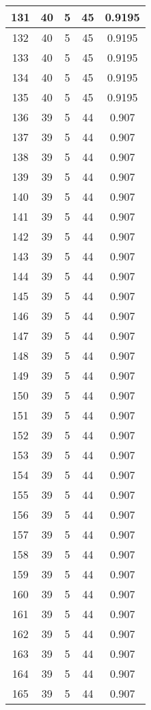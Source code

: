 \documentclass[letterpaper, 12pt]{article}
\begin{document}
\begin{longtable}{|c|c|c|c|c|}
\hline
131 & 40 & 5 & 45 & 0.9195 \\
\hline
132 & 40 & 5 & 45 & 0.9195 \\
\hline
133 & 40 & 5 & 45 & 0.9195 \\
\hline
134 & 40 & 5 & 45 & 0.9195 \\
\hline
135 & 40 & 5 & 45 & 0.9195 \\
\hline
136 & 39 & 5 & 44 & 0.907 \\
\hline
137 & 39 & 5 & 44 & 0.907 \\
\hline
138 & 39 & 5 & 44 & 0.907 \\
\hline
139 & 39 & 5 & 44 & 0.907 \\
\hline
140 & 39 & 5 & 44 & 0.907 \\
\hline
141 & 39 & 5 & 44 & 0.907 \\
\hline
142 & 39 & 5 & 44 & 0.907 \\
\hline
143 & 39 & 5 & 44 & 0.907 \\
\hline
144 & 39 & 5 & 44 & 0.907 \\
\hline
145 & 39 & 5 & 44 & 0.907 \\
\hline
146 & 39 & 5 & 44 & 0.907 \\
\hline
147 & 39 & 5 & 44 & 0.907 \\
\hline
148 & 39 & 5 & 44 & 0.907 \\
\hline
149 & 39 & 5 & 44 & 0.907 \\
\hline
150 & 39 & 5 & 44 & 0.907 \\
\hline
151 & 39 & 5 & 44 & 0.907 \\
\hline
152 & 39 & 5 & 44 & 0.907 \\
\hline
153 & 39 & 5 & 44 & 0.907 \\
\hline
154 & 39 & 5 & 44 & 0.907 \\
\hline
155 & 39 & 5 & 44 & 0.907 \\
\hline
156 & 39 & 5 & 44 & 0.907 \\
\hline
157 & 39 & 5 & 44 & 0.907 \\
\hline
158 & 39 & 5 & 44 & 0.907 \\
\hline
159 & 39 & 5 & 44 & 0.907 \\
\hline
160 & 39 & 5 & 44 & 0.907 \\
\hline
161 & 39 & 5 & 44 & 0.907 \\
\hline
162 & 39 & 5 & 44 & 0.907 \\
\hline
163 & 39 & 5 & 44 & 0.907 \\
\hline
164 & 39 & 5 & 44 & 0.907 \\
\hline
165 & 39 & 5 & 44 & 0.907 \\

\end{longtable}
\end{document}

